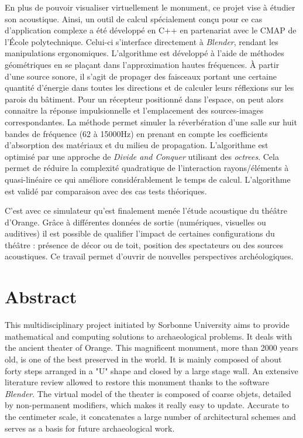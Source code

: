  En plus de pouvoir visualiser virtuellement le monument, ce projet vise à étudier son acoustique. Ainsi, un outil de calcul spécialement conçu pour ce cas d'application complexe a été développé en C++ en partenariat avec le CMAP de l'École polytechnique. Celui-ci s'interface directement à \textit{Blender}, rendant les manipulations ergonomiques. L'algorithme est développé à l'aide de méthodes géométriques en se plaçant dans l'approximation hautes fréquences. À partir d'une source sonore, il s'agit de propager des faisceaux portant une certaine quantité d'énergie dans toutes les directions et de calculer leurs réflexions sur les parois du bâtiment. Pour un récepteur positionné dans l'espace, on peut alors connaitre la réponse impulsionnelle et l'emplacement des sources-images correspondantes. La méthode permet simuler la réverbération d'une salle sur huit bandes de fréquence (62 à 15000Hz) en prenant en compte les coefficients d'absorption des matériaux et du milieu de propagation. L'algorithme est optimisé par une approche de \textit{Divide and Conquer} utilisant des \textit{octrees}. Cela permet de réduire la complexité quadratique de l'interaction rayons/éléments à quasi-linéaire ce qui améliore considérablement le temps de calcul. L'algorithme est validé par comparaison avec des cas tests théoriques.
 
C'est avec ce simulateur qu'est finalement menée l'étude acoustique du théâtre d'Or\-ange. Grâce à différentes données de sortie (numériques, visuelles ou auditives) il est possible de qualifier l'impact de certaines configurations du théâtre : présence de décor ou de toit, position des spectateurs ou des sources acoustiques. Ce travail permet d'ouvrir de nouvelles perspectives archéologiques.



\chapter*{Abstract}
This multidisciplinary project initiated by Sorbonne University aims to provide mathematical and computing solutions to archaeological problems. It deals with the ancient theater of Orange. This magnificent monument, more than 2000 years old, is one of the best preserved in the world. It is mainly composed of about forty steps arranged in a "U" shape and closed by a large stage wall. An extensive literature review allowed to restore this monument thanks to the software \textit{Blender}. The virtual model of the theater is composed of coarse objets, detailed by non-permanent modifiers, which makes it really easy to update. Accurate to the centimeter scale, it concatenates a large number of architectural schemes and serves as a basis for future archaeological work.


